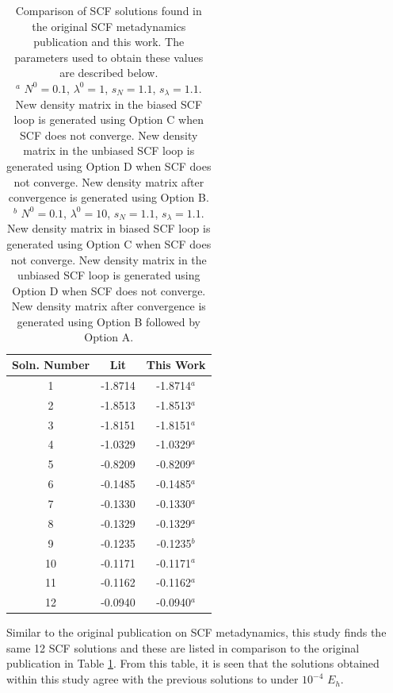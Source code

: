 \documentclass[final,3p,times,twocolumn]{elsarticle}
\begin{document}
\begin{table}
\centering
\begin{tabular}{c|cc} \hline\hline
Soln. Number & Lit\cite{scfmd} & This Work \\ \hline
1 & -1.8714 & -1.8714$^a$ \\
2 & -1.8513 & -1.8513$^a$ \\
3 & -1.8151 & -1.8151$^a$ \\
4 & -1.0329 & -1.0329$^a$ \\
5 & -0.8209 & -0.8209$^a$ \\
6 & -0.1485 & -0.1485$^a$ \\
7 & -0.1330 & -0.1330$^a$ \\
8 & -0.1329 & -0.1329$^a$ \\
9 & -0.1235 & -0.1235$^b$ \\
10 & -0.1171 & -0.1171$^a$ \\
11 & -0.1162 & -0.1162$^a$ \\
12 & -0.0940 & -0.0940$^a$ \\ \hline\hline
\end{tabular}
\caption{Comparison of SCF solutions found in the original SCF metadynamics publication\cite{scfmd} and this work. The parameters used to obtain these values are described below.\\
$^a$ $N^0 = 0.1$, $\lambda^0 = 1$, $s_N = 1.1$, $s_\lambda = 1.1$. New density matrix in the biased SCF loop is generated using Option C when SCF does not converge. New density matrix in the unbiased SCF loop is generated using Option D when SCF does not converge. New density matrix after convergence is generated using Option B.\\
$^b$ $N^0 = 0.1$, $\lambda^0 = 10$, $s_N = 1.1$, $s_\lambda = 1.1$. New density matrix in biased SCF loop is generated using Option C when SCF does not converge. New density matrix in the unbiased SCF loop is generated using Option D when SCF does not converge. New density matrix after convergence is generated using Option B followed by Option A.}
\label{tab:h4results}
\end{table}

Similar to the original publication on SCF metadynamics,\cite{scfmd} this study finds the same 12 SCF solutions and these are listed in comparison to the original publication in Table \ref{tab:h4results}. From this table, it is seen that the solutions obtained within this study agree with the previous solutions to under $10^{-4}$ $E_h$. 
\end{document}
